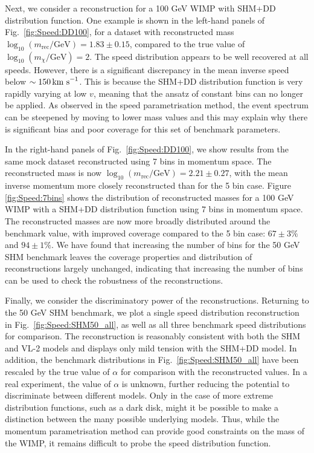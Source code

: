 Next, we consider a reconstruction for a 100 GeV WIMP with SHM+DD distribution function. One example is shown in the left-hand panels of Fig.\ \ref{fig:Speed:DD100}, for a dataset with reconstructed mass \(\log_{10}(m_\textrm{rec} / \textrm{GeV}) = 1.83 \pm 0.15\), compared to the true value of \(\log_{10}(m_\chi / \textrm{GeV}) = 2\). The speed distribution appears to be well recovered at all speeds. However, there is a significant discrepancy in the mean inverse speed below \(\sim 150 \,\textrm{km s}^{-1}\). This is because the SHM+DD distribution function is very rapidly varying at low \(v\), meaning that the ansatz of constant bins can no longer be applied. As observed in the speed parametrisation method, the event spectrum can be steepened by moving to lower mass values and this may explain why there is significant bias and poor coverage for this set of benchmark parameters.

In the right-hand panels of Fig.\ \ref{fig:Speed:DD100}, we show results from the same mock dataset reconstructed using 7 bins in momentum space. The reconstructed mass is now \(\log_{10}(m_\textrm{rec} / \textrm{GeV}) = 2.21 \pm 0.27\), with the mean inverse momentum more closely reconstructed than for the 5 bin case. Figure \ref{fig:Speed:7bins} shows the distribution of reconstructed masses for a 100 GeV WIMP with a SHM+DD distribution function using 7 bins in momentum space. The reconstructed masses are now more broadly distributed around the benchmark value, with improved coverage compared to the 5 bin case: \(67 \pm 3 \%\) and \(94 \pm 1 \%\). We have found that increasing the number of bins for the 50 GeV SHM benchmark leaves the coverage properties and distribution of reconstructions largely unchanged, indicating that increasing the number of bins can be used to check the robustness of the reconstructions.


Finally, we consider the discriminatory power of the reconstructions. Returning to the 50 GeV SHM benchmark, we plot a single speed distribution reconstruction in Fig.\ \ref{fig:Speed:SHM50_all}, as well as all three benchmark speed distributions for comparison. The reconstruction is reasonably consistent with both the SHM and VL-2 models and displays only mild tension with the SHM+DD model. In addition, the benchmark distributions in Fig.\ \ref{fig:Speed:SHM50_all} have been rescaled by the true value of \(\alpha\) for comparison with the reconstructed values. In a real experiment, the value of \(\alpha\) is unknown, further reducing the potential to discriminate between different models. Only in the case of more extreme distribution functions, such as a dark disk, might it be possible to make a distinction between the many possible underlying models. Thus, while the momentum parametrisation method can provide good constraints on the mass of the WIMP, it remains difficult to probe the speed distribution function.

